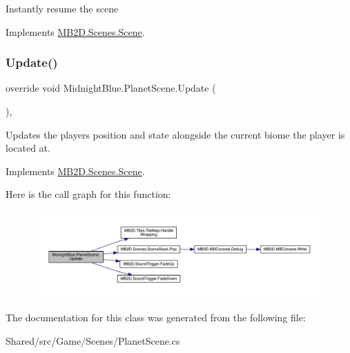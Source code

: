 Instantly resume the scene 



Implements \hyperlink{class_m_b2_d_1_1_scenes_1_1_scene_ad13639db22b059a1b714eefd9d927735}{M\+B2\+D.\+Scenes.\+Scene}.

\hypertarget{class_midnight_blue_1_1_planet_scene_add0a85b4f754f026231aa7269259c65c}{}\label{class_midnight_blue_1_1_planet_scene_add0a85b4f754f026231aa7269259c65c} 
\subsubsection{\texorpdfstring{Update()}{Update()}}
{\footnotesize\ttfamily override void Midnight\+Blue.\+Planet\+Scene.\+Update (\begin{DoxyParamCaption}{ }\end{DoxyParamCaption})\hspace{0.3cm}{\ttfamily [inline]}, {\ttfamily [virtual]}}



Updates the players position and state alongside the current biome the player is located at. 



Implements \hyperlink{class_m_b2_d_1_1_scenes_1_1_scene_a779de7c1ab23b698dcde3a228324a991}{M\+B2\+D.\+Scenes.\+Scene}.

Here is the call graph for this function\+:
\nopagebreak
\begin{figure}[H]
\begin{center}
\leavevmode
\includegraphics[width=350pt]{class_midnight_blue_1_1_planet_scene_add0a85b4f754f026231aa7269259c65c_cgraph}
\end{center}
\end{figure}


The documentation for this class was generated from the following file\+:\begin{DoxyCompactItemize}
\item 
Shared/src/\+Game/\+Scenes/Planet\+Scene.\+cs\end{DoxyCompactItemize}
